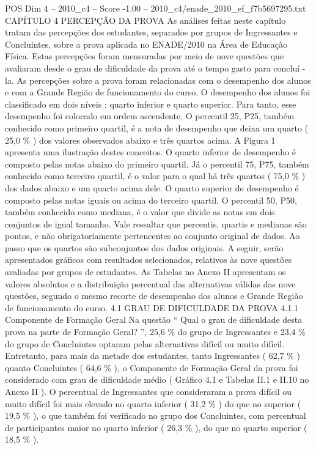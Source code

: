 \begin{textsample}{POS Dim 4 – 2010\_c4 – Score -1.00 – 2010\_c4/enade\_2010\_ef\_f7b5697295.txt}  \label{ex:f4_pos_290}
CAPÍTULO 4 PERCEPÇÃO DA PROVA As análises feitas neste capítulo tratam das percepções dos estudantes, separados por grupos de Ingressantes e Concluintes, sobre a prova aplicada no ENADE/2010 na Área de Educação Física.
Estas percepções foram mensuradas por meio de nove questões que avaliaram desde o grau de dificuldade da prova até o tempo gasto para concluí -la.
As percepções sobre a prova foram relacionadas com o desempenho dos alunos e com a Grande Região de funcionamento do curso.
O desempenho dos alunos foi classificado em dois níveis : quarto inferior e quarto superior.
Para tanto, esse desempenho foi colocado em ordem ascendente.
O percentil 25, P25, também conhecido como primeiro quartil, é a nota de desempenho que deixa um quarto ( 25,0 \% ) dos valores observados abaixo e três quartos acima.
A Figura 1 apresenta uma ilustração destes conceitos.
O quarto inferior de desempenho é composto pelas notas abaixo do primeiro quartil.
Já o percentil 75, P75, também conhecido como terceiro quartil, é o valor para o qual há três quartos ( 75,0 \% ) dos dados abaixo e um quarto acima dele.
O quarto superior de desempenho é composto pelas notas iguais ou acima do terceiro quartil.
O percentil 50, P50, também conhecido como mediana, é o valor que divide as notas em dois conjuntos de igual tamanho.
Vale ressaltar que percentis, quartis e medianas são pontos, e não obrigatoriamente pertencentes ao conjunto original de dados.
Ao passo que os quartos são subconjuntos dos dados originais.
A seguir, serão apresentados gráficos com resultados selecionados, relativos às nove questões avaliadas por grupos de estudantes.
As Tabelas no Anexo II apresentam os valores absolutos e a distribuição percentual das alternativas válidas das nove questões, segundo o mesmo recorte de desempenho dos alunos e Grande Região de funcionamento do curso. 4.1 GRAU DE DIFICULDADE DA PROVA 4.1.1 Componente de Formação Geral Na questão “ Qual o grau de dificuldade desta prova na parte de Formação Geral? ”, 25,6 \% do grupo de Ingressantes e 23,4 \% do grupo de Concluintes optaram pelas alternativas difícil ou muito difícil.
Entretanto, para mais da metade dos estudantes, tanto Ingressantes ( 62,7 \% ) quanto Concluintes ( 64,6 \% ), o Componente de Formação Geral da prova foi considerado com grau de dificuldade médio ( Gráfico 4.1 e Tabelas II.1 e II.10 no Anexo II ).
O percentual de Ingressantes que consideraram a prova difícil ou muito difícil foi mais elevado no quarto inferior ( 31,2 \% ) do que no superior ( 19,5 \% ), o que também foi verificado no grupo dos Concluintes, com percentual de participantes maior no quarto inferior ( 26,3 \% ), do que no quarto superior ( 18,5 \% ).

\end{textsample}
